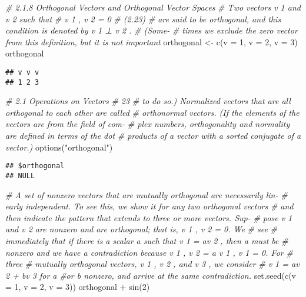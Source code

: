 \documentclass[
]{article}
\newenvironment{Shaded}{\begin{snugshade}}{\end{snugshade}}
\newcommand{\AttributeTok}[1]{\textcolor[rgb]{0.77,0.63,0.00}{#1}}
\newcommand{\CommentTok}[1]{\textcolor[rgb]{0.56,0.35,0.01}{\textit{#1}}}
\newcommand{\DecValTok}[1]{\textcolor[rgb]{0.00,0.00,0.81}{#1}}
\newcommand{\FunctionTok}[1]{\textcolor[rgb]{0.00,0.00,0.00}{#1}}
\newcommand{\NormalTok}[1]{#1}
\newcommand{\OtherTok}[1]{\textcolor[rgb]{0.56,0.35,0.01}{#1}}
\newcommand{\SpecialCharTok}[1]{\textcolor[rgb]{0.00,0.00,0.00}{#1}}
\newcommand{\StringTok}[1]{\textcolor[rgb]{0.31,0.60,0.02}{#1}}
\begin{document}
\begin{Shaded}
\begin{Highlighting}[]
\CommentTok{\# 2.1.8 Orthogonal Vectors and Orthogonal Vector Spaces}
\CommentTok{\# Two vectors v 1 and v 2 such that}
\CommentTok{\# v 1 , v 2 = 0}
\CommentTok{\# (2.23)}
\CommentTok{\# are said to be orthogonal, and this condition is denoted by v 1 ⊥ v 2 . }
\CommentTok{\# (Some{-}}
\CommentTok{\# times we exclude the zero vector from this deﬁnition, but it is not important}
\NormalTok{orthogonal }\OtherTok{\textless{}{-}} \FunctionTok{c}\NormalTok{(}\AttributeTok{v =} \DecValTok{1}\NormalTok{, }\AttributeTok{v =} \DecValTok{2}\NormalTok{, }\AttributeTok{v =} \DecValTok{3}\NormalTok{)}
\NormalTok{orthogonal}
\end{Highlighting}
\end{Shaded}

\begin{verbatim}
## v v v 
## 1 2 3
\end{verbatim}

\begin{Shaded}
\begin{Highlighting}[]
\CommentTok{\# 2.1 Operations on Vectors}
\CommentTok{\# 23}
\CommentTok{\# to do so.) Normalized vectors that are all orthogonal to each other are called}
\CommentTok{\# orthonormal vectors. (If the elements of the vectors are from the ﬁeld of com{-}}
\CommentTok{\# plex numbers, orthogonality and normality are deﬁned in terms of the dot}
\CommentTok{\# products of a vector with a sorted conjugate of a vector.)}
\FunctionTok{options}\NormalTok{(}\StringTok{"orthogonal"}\NormalTok{)}
\end{Highlighting}
\end{Shaded}

\begin{verbatim}
## $orthogonal
## NULL
\end{verbatim}

\begin{Shaded}
\begin{Highlighting}[]
\CommentTok{\# A set of nonzero vectors that are mutually orthogonal are necessarily lin{-}}
\CommentTok{\# early independent. To see this, we show it for any two orthogonal vectors}
\CommentTok{\# and then indicate the pattern that extends to three or more vectors. Sup{-}}
\CommentTok{\# pose v 1 and v 2 are nonzero and are orthogonal; that is, v 1 , v 2 = 0. We }
\CommentTok{\# see}
\CommentTok{\# immediately that if there is a scalar a such that v 1 = av 2 , then a must be}
\CommentTok{\# nonzero and we have a contradiction because v 1 , v 2 = a v 1 , v 1 = 0. For }
\CommentTok{\# three}
\CommentTok{\# mutually orthogonal vectors, v 1 , v 2 , and v 3 , we consider }
\CommentTok{\# v 1 = av 2 + bv 3 for a}
 \CommentTok{\#or b nonzero, and arrive at the same contradiction.}
\FunctionTok{set.seed}\NormalTok{(}\FunctionTok{c}\NormalTok{(}\AttributeTok{v =} \DecValTok{1}\NormalTok{, }\AttributeTok{v =} \DecValTok{2}\NormalTok{, }\AttributeTok{v =} \DecValTok{3}\NormalTok{))}
\NormalTok{orthogonal }\SpecialCharTok{+} \FunctionTok{sin}\NormalTok{(}\DecValTok{2}\NormalTok{)}
\end{Highlighting}
\end{Shaded}
\end{document}
